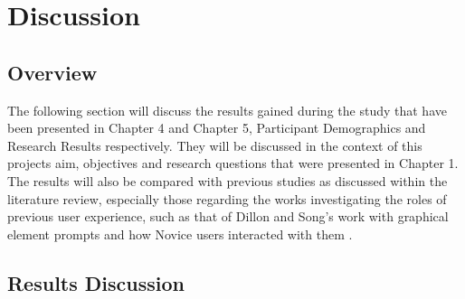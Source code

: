 \chapter{Discussion}
\section{Overview}
The following section will discuss the results gained during the study that have been presented in Chapter 4 and Chapter 5, Participant Demographics and Research Results respectively. They will be discussed in the context of this projects aim, objectives and research questions that were presented in Chapter 1. The results will also be compared with previous studies as discussed within the literature review, especially those regarding the works investigating the roles of previous user experience, such as that of Dillon and Song's work with graphical element prompts and how Novice users interacted with them \citep*{dillon1997empirical}.

\section{Results Discussion}

